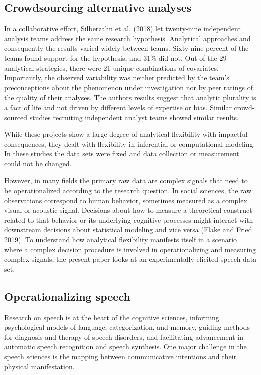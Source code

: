 \documentclass[
  12pt,
]{article}
\begin{document}
\hypertarget{crowdsourcing-alternative-analyses}{%
\subsection{Crowdsourcing alternative analyses}\label{crowdsourcing-alternative-analyses}}

In a collaborative effort, Silberzahn et al. (2018) let twenty-nine independent analysis teams address the same research hypothesis.
Analytical approaches and consequently the results varied widely between teams.
Sixty-nine percent of the teams found support for the hypothesis, and 31\% did not.
Out of the 29 analytical strategies, there were 21 unique combinations of covariates.
Importantly, the observed variability was neither predicted by the team's preconceptions about the phenomenon under investigation nor by peer ratings of the quality of their analyses.
The authors results suggest that analytic plurality is a fact of life and not driven by different levels of expertise or bias.
Similar crowd-sourced studies recruiting independent analyst teams showed similar results.

While these projects show a large degree of analytical flexibility with impactful consequences, they dealt with flexibility in inferential or computational modeling.
In these studies the data sets were fixed and data collection or measurement could not be changed.

However, in many fields the primary raw data are complex signals that need to be operationalized according to the research question.
In social sciences, the raw observations correspond to human behavior, sometimes measured as a complex visual or acoustic signal.
Decisions about how to measure a theoretical construct related to that behavior or its underlying cognitive processes might interact with downstream decisions about statistical modeling and vice versa (Flake and Fried 2019).
To understand how analytical flexibility manifests itself in a scenario where a complex decision procedure is involved in operationalizing and measuring complex signals, the present paper looks at an experimentally elicited speech data set.

\hypertarget{operationalizing-speech}{%
\subsection{Operationalizing speech}\label{operationalizing-speech}}

Research on speech is at the heart of the cognitive sciences, informing psychological models of language, categorization, and memory, guiding methods for diagnosis and therapy of speech disorders, and facilitating advancement in automatic speech recognition and speech synthesis. One major challenge in the speech sciences is the mapping between communicative intentions and their physical manifestation.
\end{document}
